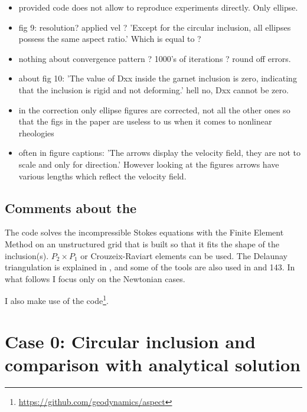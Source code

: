 \begin{itemize}
\item provided code does not allow to reproduce experiments directly. Only ellipse. 

\item fig 9: resolution? applied vel ? 'Except for the circular inclusion, all ellipses possess the same aspect ratio.' Which is equal to ?

\item nothing about convergence pattern ? 1000's of iterations ? round off errors.

\item about fig 10: 'The value of Dxx inside the garnet inclusion is zero, indicating that the inclusion is rigid and not deforming.' hell no, Dxx cannot be zero. 

\item in the correction only ellipse figures are corrected, not all the other ones so that the figs in the paper are useless to us when it comes to nonlinear rheologies

\item often in figure captions: 'The arrows display the velocity field, they are not to scale and only for direction.'
However looking at the figures arrows have various lengths which reflect the velocity field.

\end{itemize}



\subsection*{Comments about the \stone}

The code solves the incompressible Stokes equations with the Finite Element Method
on an unstructured grid that is built so that it fits the shape of the inclusion(s).
$P_2\times P_1$ or Crouzeix-Raviart elements can be used.
The Delaunay triangulation is explained in , and 
some of the tools are also used in  and 143.
In what follows I focus only on the Newtonian cases.

I also make use of the \aspect code\footnote{\url{https://github.com/geodynamics/aspect}}. 

\newpage
\section*{Case 0: Circular inclusion and comparison with analytical solution}

